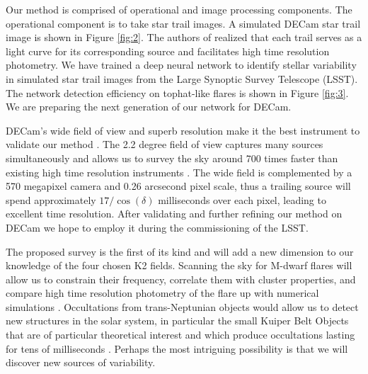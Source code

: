 \documentclass[11pt]{article}
\begin{document}
Our method is comprised of operational and image processing components. The operational component is to take star trail images. A simulated DECam star trail image is shown in Figure \ref{fig:2}. The authors of \citealt{1986PASP...98..802H} realized that each trail serves as a light curve for its corresponding source and facilitates high time resolution photometry. We have trained a deep neural network to identify stellar variability in simulated star trail images from the Large Synoptic Survey Telescope (LSST). The network detection efficiency on tophat-like flares is shown in Figure \ref{fig:3}. We are preparing the next generation of our network for DECam. 

DECam's wide field of view and superb resolution make it the best instrument to validate our method \citep{2015AJ....150..150F}. The 2.2 degree field of view captures many sources simultaneously and allows us to survey the sky around 700 times faster than existing high time resolution instruments \citep{2007MNRAS.378..825D}. The wide field is complemented by a 570 megapixel camera and 0.26 arcsecond pixel scale, thus a trailing source will spend approximately $17 / \cos(\delta)$ milliseconds over each pixel, leading to excellent time resolution. After validating and further refining our method on DECam we hope to employ it during the commissioning of the LSST. 

The proposed survey is the first of its kind and will add a new dimension to our knowledge of the four chosen K2 fields. Scanning the sky for M-dwarf flares will allow us to constrain their frequency, correlate them with cluster properties, and compare high time resolution photometry of the flare up with numerical simulations \citep{2017ApJ...849...36Y,2017ApJS..232...26V}. Occultations from trans-Neptunian objects would allow us to detect new structures in the solar system, in particular the small Kuiper Belt Objects that are of particular theoretical interest and which produce occultations lasting for tens of milliseconds \citep{2000Icar..147..530R,2013AJ....146...14Z}. Perhaps the most intriguing possibility is that we will discover new sources of variability. 



\end{document}
